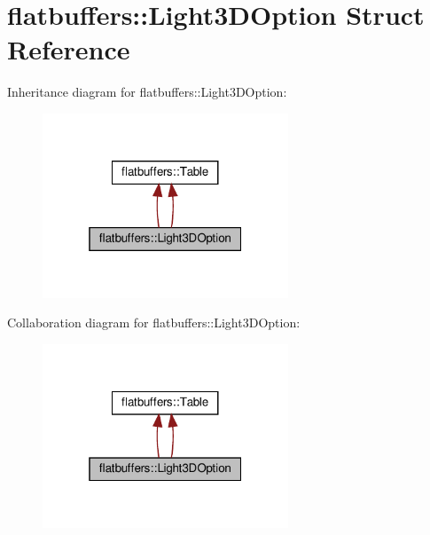 \hypertarget{structflatbuffers_1_1Light3DOption}{}\section{flatbuffers\+:\+:Light3\+D\+Option Struct Reference}
\label{structflatbuffers_1_1Light3DOption}


Inheritance diagram for flatbuffers\+:\+:Light3\+D\+Option\+:
\nopagebreak
\begin{figure}[H]
\begin{center}
\leavevmode
\includegraphics[width=208pt]{structflatbuffers_1_1Light3DOption__inherit__graph}
\end{center}
\end{figure}


Collaboration diagram for flatbuffers\+:\+:Light3\+D\+Option\+:
\nopagebreak
\begin{figure}[H]
\begin{center}
\leavevmode
\includegraphics[width=208pt]{structflatbuffers_1_1Light3DOption__coll__graph}
\end{center}
\end{figure}
